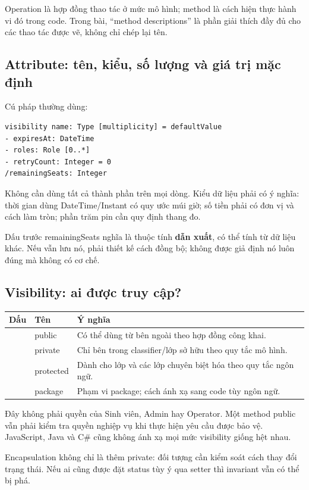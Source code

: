 Operation là hợp đồng thao tác ở mức mô hình; method là cách hiện thực hành vi đó trong code. Trong bài, ``method descriptions'' là phần giải thích đầy đủ cho các thao tác được vẽ, không chỉ chép lại tên.

\subsection{Attribute: tên, kiểu, số lượng và giá trị mặc định}
Cú pháp thường dùng:
\begin{Verbatim}
visibility name: Type [multiplicity] = defaultValue
- expiresAt: DateTime
- roles: Role [0..*]
- retryCount: Integer = 0
/remainingSeats: Integer
\end{Verbatim}
Không cần dùng tất cả thành phần trên mọi dòng. Kiểu dữ liệu phải có ý nghĩa: thời gian dùng DateTime/Instant có quy ước múi giờ; số tiền phải có đơn vị và cách làm tròn; phần trăm pin cần quy định thang đo.

Dấu \code{/} trước remainingSeats nghĩa là thuộc tính \textbf{dẫn xuất}, có thể tính từ dữ liệu khác. Nếu vẫn lưu nó, phải thiết kế cách đồng bộ; không được giả định nó luôn đúng mà không có cơ chế.

\subsection{Visibility: ai được truy cập?}
\begin{center}\begin{tabularx}{\linewidth}{|C{13mm}|L{29mm}|Y|}\hline
\textbf{Dấu} & \textbf{Tên} & \textbf{Ý nghĩa}\\\hline
\code{+} & public & Có thể dùng từ bên ngoài theo hợp đồng công khai.\\\hline
\code{-} & private & Chỉ bên trong classifier/lớp sở hữu theo quy tắc mô hình.\\\hline
\code{\#} & protected & Dành cho lớp và các lớp chuyên biệt hóa theo quy tắc ngôn ngữ.\\\hline
\code{\textasciitilde} & package & Phạm vi package; cách ánh xạ sang code tùy ngôn ngữ.\\\hline
\end{tabularx}\end{center}
Đây không phải quyền của Sinh viên, Admin hay Operator. Một method public vẫn phải kiểm tra quyền nghiệp vụ khi thực hiện yêu cầu được bảo vệ. JavaScript, Java và C\# cũng không ánh xạ mọi mức visibility giống hệt nhau.

Encapsulation không chỉ là thêm private: đối tượng cần kiểm soát cách thay đổi trạng thái. Nếu ai cũng được đặt status tùy ý qua setter thì invariant vẫn có thể bị phá.

